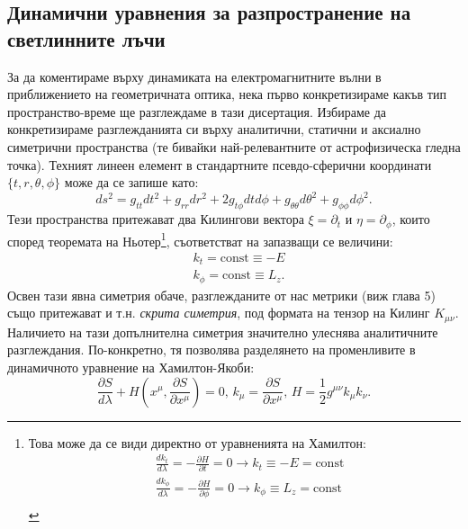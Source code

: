 \subsection{Динамични уравнения за разпространение на светлинните лъчи}
За да коментираме върху динамиката на електромагнитните вълни в приближението на геометричната оптика, нека първо конкретизираме какъв тип пространство-време ще разглеждаме в тази дисертация. Избираме да конкретизираме разглежданията си върху аналитични, статични и аксиално симетрични пространства (те бивайки най-релевантните от астрофизическа гледна точка). Техният линеен елемент в стандартните псевдо-сферични координати $\{t,r,\theta,\phi\}$ може да се запише като:
\begin{equation}
	ds^2 = g_{tt}dt^2 + g_{rr}dr^2 + 2g_{t\phi}dtd\phi + g_{\theta\theta}d\theta^2 + g_{\phi\phi} d\phi^2. 
\end{equation}
Тези пространства притежават два Килингови вектора $\xi = \partial_t$ и $\eta = \partial_\phi$, които според теоремата на Ньотер\footnote{Това може да се види директно от уравненията на Хамилтон:
	\begin{equation*}
		\begin{aligned}
			&\frac{dk_t}{d\lambda} = - \frac{\partial H}{\partial t} = 0 \rightarrow k_t \equiv -E = \text{const}\\
			&\frac{dk_\phi}{d\lambda} = - \frac{\partial H}{\partial \phi} = 0 \rightarrow k_\phi \equiv L_z = \text{const}\\
		\end{aligned}
\end{equation*}}, съответстват на запазващи се величини:
\begin{subequations}
	\begin{align}
		&k_t = \text{const} \equiv -E\\
		&k_\phi = \text{const} \equiv L_z.
	\end{align}
\end{subequations}
Освен тази явна симетрия обаче, разглежданите от нас метрики (виж глава 5) също притежават и т.н. \emph{скрита симетрия}, под формата на тензор на Килинг $K_{\mu\nu}$. Наличието на тази допълнителна симетрия значително улеснява аналитичните разглеждания. По-конкретно, тя позволява разделянето на променливите в динамичното уравнение на Хамилтон-Якоби:
\begin{equation}
	\frac{\partial S}{d\lambda} + H\left(x^\mu,\frac{\partial S}{\partial x^\mu}\right) = 0, \,k_\mu = \frac{\partial S}{\partial x^\mu},\, H = \frac{1}{2}g^{\mu\nu}k_\mu k_\nu.
\end{equation}
